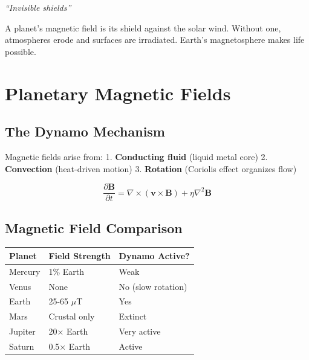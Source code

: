 \documentclass[
  11pt,
  letterpaper,
  twoside,
  openright]{book}
\begin{document}
\emph{``Invisible shields''}

\begin{tcolorbox}[enhanced jigsaw, coltitle=black, colbacktitle=quarto-callout-note-color!10!white, toprule=.15mm, colframe=quarto-callout-note-color-frame, arc=.35mm, opacityback=0, bottomtitle=1mm, toptitle=1mm, breakable, colback=white, titlerule=0mm, opacitybacktitle=0.6, title=\textcolor{quarto-callout-note-color}{\faInfo}\hspace{0.5em}{Key Revelation}, rightrule=.15mm, bottomrule=.15mm, leftrule=.75mm, left=2mm]

A planet's magnetic field is its shield against the solar wind. Without
one, atmospheres erode and surfaces are irradiated. Earth's
magnetosphere makes life possible.

\end{tcolorbox}

\section{Planetary Magnetic Fields}\label{planetary-magnetic-fields}

\subsection{The Dynamo Mechanism}\label{the-dynamo-mechanism}

Magnetic fields arise from: 1. \textbf{Conducting fluid} (liquid metal
core) 2. \textbf{Convection} (heat-driven motion) 3. \textbf{Rotation}
(Coriolis effect organizes flow)

\[
\frac{\partial \mathbf{B}}{\partial t} = \nabla \times (\mathbf{v} \times \mathbf{B}) + \eta \nabla^2 \mathbf{B}
\]

\subsection{Magnetic Field Comparison}\label{magnetic-field-comparison}

\begin{longtable}[]{@{}lll@{}}
\toprule\noalign{}
Planet & Field Strength & Dynamo Active? \\
\midrule\noalign{}
\endhead
\bottomrule\noalign{}
\endlastfoot
Mercury & 1\% Earth & Weak \\
Venus & None & No (slow rotation) \\
Earth & 25-65 \(\mu\)T & Yes \\
Mars & Crustal only & Extinct \\
Jupiter & 20× Earth & Very active \\
Saturn & 0.5× Earth & Active \\
\end{longtable}
\end{document}
